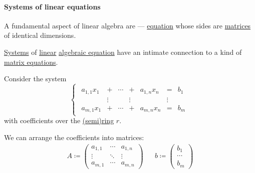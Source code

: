 \paragraph{Systems of linear equations}

\begin{definition}\label{def:matrix_equation}\mimprovised
  A fundamental aspect of linear algebra are  --- \hyperref[def:equation]{equation} whose sides are \hyperref[def:array/matrix]{matrices} of identical dimensions.
\end{definition}

\begin{definition}\label{def:system_of_linear_equations}\mimprovised
  \hyperref[def:equation/system]{Systems} of \hyperref[def:polynomial_degree_terminology]{linear} \hyperref[def:algebraic_equation]{algebraic equation} have an intimate connection to a kind of \hyperref[def:matrix_equation]{matrix equations}.

  Consider the system
  \begin{equation}\label{eq:def:system_of_linear_equations/scalar_form}
    \begin{cases}
      \begin{array}{ccccccc}
        a_{1,1} x_1 & +      & \cdots & +      & a_{1,n} x_n & =      & b_1 \\
                    & \vdots &        & \vdots &             & \vdots &     \\
        a_{m,1} x_1 & +      & \cdots & +      & a_{m,n} x_n & =      & b_m
      \end{array}
    \end{cases}
  \end{equation}
  with coefficients over the \hyperref[def:semiring]{(semi)ring} \( r \).

  We can arrange the coefficients into matrices:
  \begin{align*}
    A \coloneqq \begin{pmatrix}
      a_{1,1} & \cdots & a_{1,n} \\
      \vdots  & \ddots & \vdots  \\
      a_{m,1} & \cdots & a_{m,n}
    \end{pmatrix}
    &&
    b \coloneqq \begin{pmatrix}
      b_1 \\ \cdots \\ b_m
    \end{pmatrix}
  \end{align*}


\end{definition}
